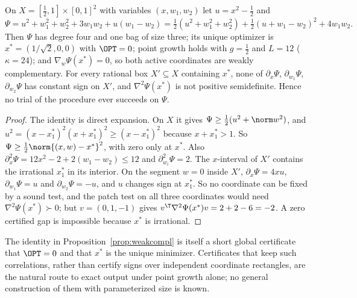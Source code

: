 \begin{proposition}\label{prop:weakcompl}
On $X=[\frac12,1]\times[0,1]^2$ with variables $(x,w_1,w_2)$ let
$u=x^2-\frac12$ and
\[
\Psi=u^2+w_1^2+w_2^2+3w_1w_2+u(w_1-w_2)
=\tfrac12(u^2+w_1^2+w_2^2)+\tfrac12(u+w_1-w_2)^2+4w_1w_2 .
\]
Then $\Psi$ has degree four and one bag of size three; its unique optimizer
is $x^*=(1/\sqrt2,0,0)$ with $\OPT=0$; point growth holds with $g=\frac12$ and
$L=12$ ($\kappa=24$); and $\nabla_w\Psi(x^*)=0$, so both active coordinates
are weakly complementary. For every rational box $X'\subseteq X$ containing
$x^*$, none of $\partial_x\Psi$, $\partial_{w_1}\Psi$, $\partial_{w_2}\Psi$ has
constant sign on $X'$, and $\nabla^2\Psi(x^*)$ is not positive semidefinite.
Hence no trial of the procedure ever succeeds on $\Psi$.
\end{proposition}

\begin{proof}
The identity is direct expansion. On $X$ it gives
$\Psi\ge\frac12(u^2+\norm w^2)$, and
$u^2=(x-x^*_1)^2(x+x^*_1)^2\ge(x-x^*_1)^2$ because $x+x^*_1>1$. So
$\Psi\ge\frac12\norm{(x,w)-x^*}^2$, with zero only at $x^*$. Also
$\partial_x^2\Psi=12x^2-2+2(w_1-w_2)\le12$ and $\partial_{w_i}^2\Psi=2$. The
$x$-interval of $X'$ contains the irrational $x^*_1$ in its interior. On the
segment $w=0$ inside $X'$, $\partial_x\Psi=4xu$, $\partial_{w_1}\Psi=u$ and
$\partial_{w_2}\Psi=-u$, and $u$ changes sign at $x^*_1$. So no coordinate can
be fixed by a sound test, and the patch test on all three coordinates would
need $\nabla^2\Psi(x^*)\succ0$; but $v=(0,1,-1)$ gives
$v^{\T}\nabla^2\Psi(x^*)v=2+2-6=-2$. A zero certified gap is impossible
because $x^*$ is irrational.
\end{proof}

The identity in Proposition~\ref{prop:weakcompl} is itself a short global
certificate that $\OPT=0$ and that $x^*$ is the unique minimizer.
Certificates that keep such correlations, rather than certify signs over
independent coordinate rectangles, are the natural route to exact output
under point growth alone; no general construction of them with parameterized
size is known.
